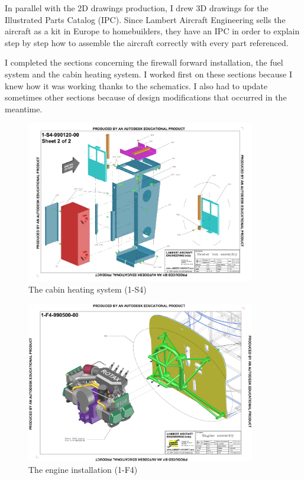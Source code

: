 \documentclass[11pt,a4paper]{article}
\begin{document}
\bigskip

In parallel with the 2D drawings production, I drew 3D drawings for the Illustrated Parts Catalog (IPC). Since Lambert Aircraft Engineering sells the aircraft as a kit in Europe to homebuilders, they have an IPC in order to explain step by step how to assemble the aircraft correctly with every part referenced.

\bigskip

I completed the sections concerning the firewall forward installation, the fuel system and the cabin heating system. I worked first on these sections because I knew how it was working thanks to the schematics. I also had to update sometimes other sections because of design modifications that occurred in the meantime.

\begin{figure}[ht!]
	\begin{center}
		\includegraphics[width=10cm,trim = 1.5cm 1cm 1.5cm 1cm, clip]{pics/PIC013.pdf}
		\caption{The cabin heating system (1-S4)}
		\label{fig:PIC013}
	\end{center}
\end{figure}

\begin{figure}[ht!]
	\begin{center}
		\includegraphics[width=10cm,trim = 1.5cm 0.5cm 1cm 1cm, clip]{pics/PIC014.pdf}
		\caption{The engine installation (1-F4)}
		\label{fig:PIC014}
	\end{center}
\end{figure}
\end{document}
